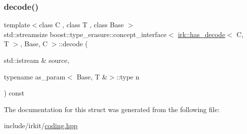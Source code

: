 \subsubsection{\texorpdfstring{decode()}{decode()}}
{\footnotesize\ttfamily template$<$class C , class T , class Base $>$ \\
std\+::streamsize boost\+::type\+\_\+erasure\+::concept\+\_\+interface$<$ \mbox{\hyperlink{structirk_1_1has__decode}{irk\+::has\+\_\+decode}}$<$ C, T $>$, Base, C $>$\+::decode (\begin{DoxyParamCaption}\item[{std\+::istream \&}]{source,  }\item[{typename as\+\_\+param$<$ Base, T \&$>$\+::type}]{n }\end{DoxyParamCaption}) const\hspace{0.3cm}{\ttfamily [inline]}}



The documentation for this struct was generated from the following file\+:\begin{DoxyCompactItemize}
\item 
include/irkit/\mbox{\hyperlink{coding_8hpp}{coding.\+hpp}}\end{DoxyCompactItemize}
